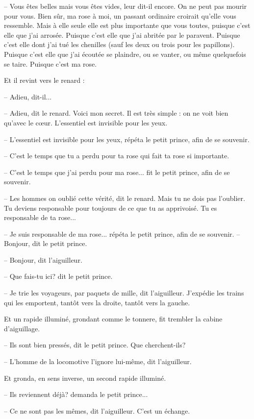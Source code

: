 \documentclass[a4paper]{report}
\begin{document}
-- Vous êtes belles mais vous êtes vides, leur dit-il encore. On ne peut pas mourir pour vous. Bien sûr, ma rose à moi, un passant ordinaire croirait qu'elle vous ressemble. Mais à elle seule elle est plus importante que vous toutes, puisque c'est elle que j'ai arrosée. Puisque c'est elle que j'ai abritée par le paravent. Puisque c'est elle dont j'ai tué les chenilles (sauf les deux ou trois pour les papillons). Puisque c'est elle que j'ai écoutée se plaindre, ou se vanter, ou même quelquefois se taire. Puisque c'est ma rose.

Et il revint vers le renard :

-- Adieu, dit-il...

-- Adieu, dit le renard. Voici mon secret. Il est très simple : on ne voit bien qu'avec le cœur. L'essentiel est invisible pour les yeux.

-- L'essentiel est invisible pour les yeux, répéta le petit prince, afin de se souvenir.

-- C'est le temps que tu a perdu pour ta rose qui fait ta rose si importante.

-- C'est le temps que j'ai perdu pour ma rose... fit le petit prince, afin de se souvenir.

-- Les hommes on oublié cette vérité, dit le renard. Mais tu ne dois pas l'oublier. Tu deviens responsable pour toujours de ce que tu as apprivoisé. Tu es responsable de ta rose...

-- Je suis responsable de ma rose... répéta le petit prince, afin de se souvenir.
\parachapter{} %
-- Bonjour, dit le petit prince.

-- Bonjour, dit l'aiguilleur.

-- Que fais-tu ici? dit le petit prince.

-- Je trie les voyageurs, par paquets de mille, dit l'aiguilleur. J'expédie les trains qui les emportent, tantôt vers la droite, tantôt vers la gauche.

Et un rapide illuminé, grondant comme le tonnere, fit trembler la cabine d'aiguillage.

-- Ils sont bien pressés, dit le petit prince. Que cherchent-ils?

-- L'homme de la locomotive l'ignore lui-même, dit l'aiguilleur.

Et gronda, en sens inverse, un second rapide illuminé.

-- Ils reviennent déjà? demanda le petit prince...

-- Ce ne sont pas les mêmes, dit l'aiguilleur. C'est un échange.
\end{document}
